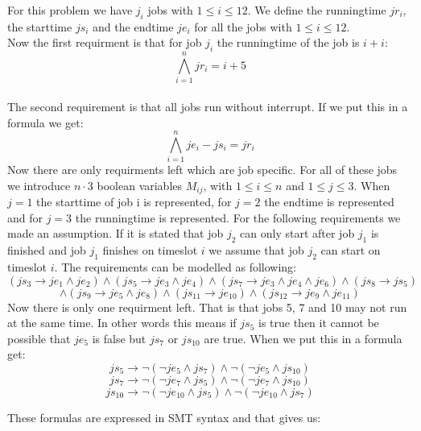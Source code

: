 \documentclass[12pt]{article}
\begin{document}
For this problem we have $j_i$ jobs with $1 \leq i \leq 12$. We define the runningtime $jr_i$, the starttime $js_i$ and the endtime $je_i$ for all the jobs with $1 \leq i \leq 12$.\\
Now the first requirment is that for job $j_i$ the runningtime of the job is $i+i$:
\[\bigwedge_{i=1}^{n} jr_i = i + 5\]\\
The second requirement is that all jobs run without interrupt. If we put this in a formula we get:
\[\bigwedge_{i=1}^{n} je_i - js_i = jr_i \]
Now there are only requirments left which are job specific. For all of these jobs we introduce $n \cdot 3$ boolean variables $M_{ij}$, with $1 \leq i \leq n$ and $1 \leq j \leq 3$. When $j =1$ the starttime of job i is represented, for $j=2$ the endtime is represented and for $j=3$ the runningtime is represented. For the following requirements we made an assumption. If it is stated that job $j_2$ can only start after job $j_1$ is finished and job $j_1$ finishes on timeslot $i$ we assume that job $j_2$ can start on timeslot $i$. The requirements can be modelled as following:\\
\[ (js_3 \rightarrow je_1 \wedge je_2) \wedge (js_5 \rightarrow je_3 \wedge je_4)  \wedge (js_7 \rightarrow je_3 \wedge je_4 \wedge je_6) \wedge (js_8 \rightarrow js_5) \]
\[ \wedge (js_9 \rightarrow je_5 \wedge je_8) \wedge (js_{11} \rightarrow je_{10})  \wedge (js_{12} \rightarrow je_9 \wedge je_{11}) \]
Now there is only one requirment left. That is that jobs 5, 7 and 10 may not run at the same time. In other words this means if $js_5$ is true then it cannot be possible that $je_5$ is false but $js_7$ or $js_{10}$ are true. When we put this in a formula get:
\[ js_5 \rightarrow  \neg(\neg je_5 \wedge js_7) \wedge\neg(\neg je_5 \wedge js_{10}) \]
\[ js_7 \rightarrow  \neg(\neg je_7 \wedge js_5) \wedge\neg(\neg je_7 \wedge js_{10}) \]
\[ js_{10} \rightarrow  \neg(\neg je_{10} \wedge js_5) \wedge\neg(\neg je_{10} \wedge js_{7}) \]

\noindent These formulas are expressed in SMT syntax and that gives us:
\end{document}
